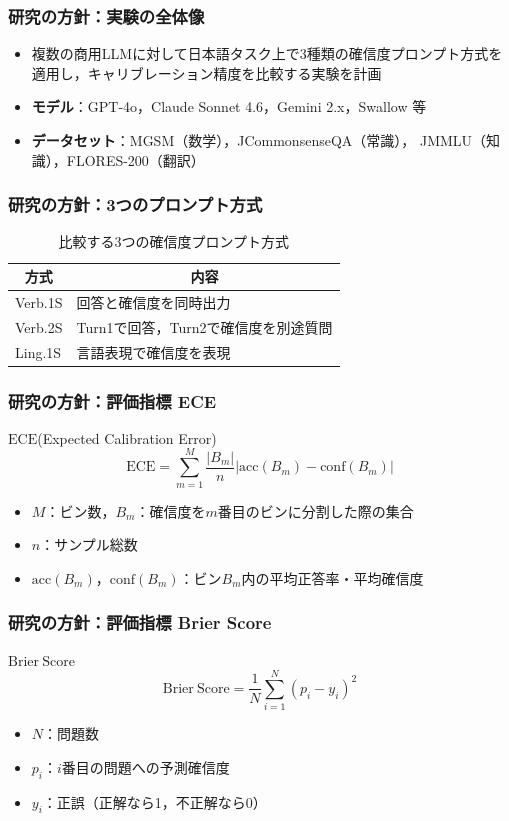 \documentclass[dvipdfmx]{beamer}
\begin{document}
\begin{frame}
\frametitle{研究の方針：実験の全体像}
\begin{itemize}
	\item 複数の商用LLMに対して日本語タスク上で3種類の確信度プロンプト方式を
	      適用し，キャリブレーション精度を比較する実験を計画
	\vspace{10pt}
	\item \textbf{モデル}：GPT-4o，Claude Sonnet 4.6，Gemini 2.x，Swallow 等
	\vspace{5pt}
	\item \textbf{データセット}：MGSM（数学），JCommonsenseQA（常識），
	      JMMLU（知識），FLORES-200（翻訳）
\end{itemize}
\end{frame}

\begin{frame}
\frametitle{研究の方針：3つのプロンプト方式}
\begin{table}
\centering
\caption{比較する3つの確信度プロンプト方式}
\begin{tabular}{|l|l|} \hline
\multicolumn{1}{|c|}{方式} & \multicolumn{1}{c|}{内容} \\ \hline
Verb.1S & 回答と確信度を同時出力 \\ \hline
Verb.2S & Turn1で回答，Turn2で確信度を別途質問 \\ \hline
Ling.1S & 言語表現で確信度を表現 \\ \hline
\end{tabular}
\end{table}
\end{frame}

\begin{frame}
\frametitle{研究の方針：評価指標 ECE}
\begin{block}{$\mathrm{ECE}$(Expected Calibration Error)}
\[
\mathrm{ECE} = \sum_{m=1}^{M} \frac{|B_m|}{n} \left|\mathrm{acc}(B_m) - \mathrm{conf}(B_m)\right|
\]
\end{block}
\begin{itemize}
	\item $M$：ビン数，$B_m$：確信度を$m$番目のビンに分割した際の集合
	\item $n$：サンプル総数
	\item $\mathrm{acc}(B_m)$，$\mathrm{conf}(B_m)$：ビン$B_m$内の平均正答率・平均確信度
\end{itemize}
\end{frame}

\begin{frame}
\frametitle{研究の方針：評価指標 Brier Score}
\begin{block}{$\mathrm{Brier\ Score}$}
\[
\mathrm{Brier\ Score} = \frac{1}{N} \sum_{i=1}^{N} (p_i - y_i)^2
\]
\end{block}
\begin{itemize}
	\item $N$：問題数
	\item $p_i$：$i$番目の問題への予測確信度
	\item $y_i$：正誤（正解なら1，不正解なら0）
\end{itemize}
\end{frame}
\end{document}

